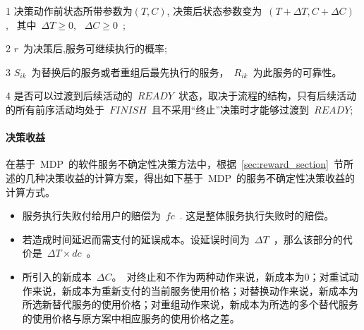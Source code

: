\begin{table}[htbp]
\begin{threeparttable}
\begin{tabular}{llllllll}
        \end{tabular}%
        \begin{tablenotes}
            \item[1] 决策动作前状态所带参数为$(T,C)$, 决策后状态参数变为~$(T+\Delta T, C+\Delta C)$,~ 其中~$\Delta T \ge 0$, ~$\Delta C \ge 0$~; 
            \item[2] $r$~为决策后,服务可继续执行的概率;
            \item[3] $S_{ik}$~为替换后的服务或者重组后最先执行的服务，~$R_{ik}$~为此服务的可靠性。
            \item[4] 是否可以过渡到后续活动的~$READY$~状态，取决于流程的结构，只有后续活动的所有前序活动均处于~$FINISH$~且不采用“终止”决策时才能够过渡到~$READY$;
        \end{tablenotes}
    \end{threeparttable}
\end{table}%

\paragraph{决策收益}

在基于~MDP~的软件服务不确定性决策方法中，根据~\ref{sec:reward_section}~节所述的几种决策收益的计算方案，得出如下基于~MDP~的服务不确定性决策收益的计算方式。
\begin{itemize}

\item 服务执行失败付给用户的赔偿为~$fc$~. 这是整体服务执行失败时的赔偿。

\item 若造成时间延迟而需支付的延误成本。设延误时间为~$\Delta T$~，那么该部分的代价是~$\Delta T \times dc$~。

\item 所引入的新成本~$\Delta C$。~对终止和不作为两种动作来说，新成本为0；对重试动作来说，新成本为重新支付的当前服务使用价格；对替换动作来说，新成本为所选新替代服务的使用价格；对重组动作来说，新成本为所选的多个替代服务的使用价格与原方案中相应服务的使用价格之差。

\end{itemize}

